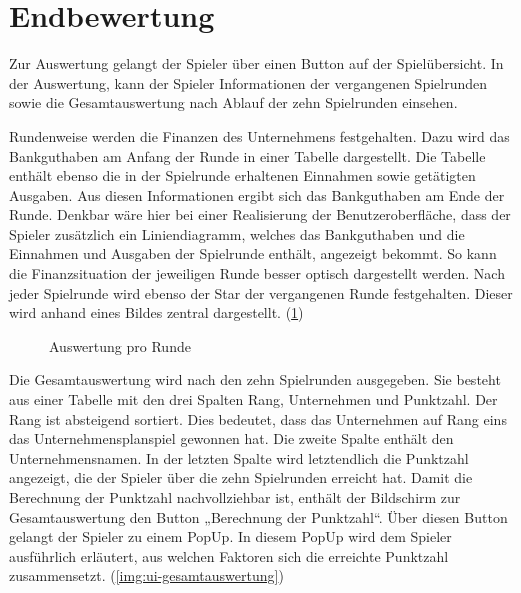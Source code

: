\section{Endbewertung}
\label{sec:ui-endbewertung}

Zur Auswertung gelangt der Spieler über einen Button auf der Spielübersicht. In der Auswertung, kann der Spieler Informationen der vergangenen Spielrunden sowie die Gesamtauswertung nach Ablauf der zehn Spielrunden einsehen.
 
Rundenweise werden die Finanzen des Unternehmens festgehalten. Dazu wird das Bankguthaben am Anfang der Runde in einer Tabelle dargestellt. Die Tabelle enthält ebenso die in der Spielrunde erhaltenen Einnahmen sowie getätigten Ausgaben. Aus diesen Informationen ergibt sich das Bankguthaben am Ende der Runde. Denkbar wäre hier bei einer Realisierung der Benutzeroberfläche, dass der Spieler zusätzlich ein Liniendiagramm, welches das Bankguthaben und die Einnahmen und Ausgaben der Spielrunde enthält, angezeigt bekommt. So kann die Finanzsituation der jeweiligen Runde besser optisch dargestellt werden. Nach jeder Spielrunde wird ebenso der Star der vergangenen Runde festgehalten. Dieser wird anhand eines Bildes zentral dargestellt. (\ref{img:ui-auswertung})

\begin{figure}[htbp]
  \centering
  \caption{Auswertung pro Runde}
  \label{img:ui-auswertung}
\end{figure}
 
Die Gesamtauswertung wird nach den zehn Spielrunden ausgegeben. Sie besteht aus einer Tabelle mit den drei Spalten Rang, Unternehmen und Punktzahl.  Der Rang ist absteigend sortiert. Dies bedeutet, dass das Unternehmen auf Rang eins das Unternehmensplanspiel gewonnen hat. Die zweite Spalte enthält den Unternehmensnamen. In der letzten Spalte wird letztendlich die Punktzahl angezeigt, die der Spieler über die zehn Spielrunden erreicht hat. Damit die Berechnung der Punktzahl nachvollziehbar ist, enthält der Bildschirm zur Gesamtauswertung den Button „Berechnung der Punktzahl“. Über diesen Button gelangt der Spieler zu einem PopUp. In diesem PopUp wird dem Spieler ausführlich erläutert, aus welchen Faktoren sich die erreichte Punktzahl zusammensetzt. (\ref{img:ui-gesamtauswertung})

